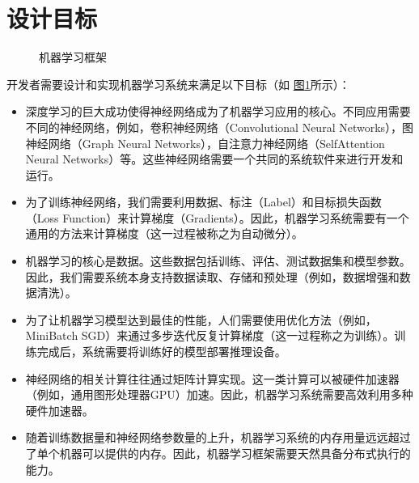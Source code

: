 \documentclass[letterpaper,10pt,english]{sphinxmanual}
\let\sphinxpxdimen\pdfpxdimen\else\newdimen\sphinxpxdimen
\begin{document}
\section{设计目标}
\label{\detokenize{chapter_introduction/requirements_for_machine_learning_systems:id1}}\label{\detokenize{chapter_introduction/requirements_for_machine_learning_systems::doc}}
\begin{figure}[H]
\centering
\capstart

\noindent\sphinxincludegraphics[width=600\sphinxpxdimen]{{framework_position}.png}
\caption{机器学习框架}\label{\detokenize{chapter_introduction/requirements_for_machine_learning_systems:id2}}\label{\detokenize{chapter_introduction/requirements_for_machine_learning_systems:framework-position}}\end{figure}

\sphinxAtStartPar
开发者需要设计和实现机器学习系统来满足以下目标（如
\hyperref[\detokenize{chapter_introduction/requirements_for_machine_learning_systems:framework-position}]{图\ref{\detokenize{chapter_introduction/requirements_for_machine_learning_systems:framework-position}}}所示）：
\begin{itemize}
\item {} 
\sphinxAtStartPar
{}
深度学习的巨大成功使得神经网络成为了机器学习应用的核心。不同应用需要不同的神经网络，例如，卷积神经网络（Convolutional
Neural Networks），图神经网络（Graph Neural
Networks），自注意力神经网络（Self\sphinxhyphen{}Attention Neural
Networks）等。这些神经网络需要一个共同的系统软件来进行开发和运行。

\item {} 
\sphinxAtStartPar
{}
为了训练神经网络，我们需要利用数据、标注（Label）和目标损失函数（Loss
Function）来计算梯度（Gradients）。因此，机器学习系统需要有一个通用的方法来计算梯度（这一过程被称之为自动微分）。

\item {} 
\sphinxAtStartPar
{}
机器学习的核心是数据。这些数据包括训练、评估、测试数据集和模型参数。因此，我们需要系统本身支持数据读取、存储和预处理（例如，数据增强和数据清洗）。

\item {} 
\sphinxAtStartPar
{}
为了让机器学习模型达到最佳的性能，人们需要使用优化方法（例如，Mini\sphinxhyphen{}Batch
SGD）来通过多步迭代反复计算梯度（这一过程称之为训练）。训练完成后，系统需要将训练好的模型部署推理设备。

\item {} 
\sphinxAtStartPar
{}
神经网络的相关计算往往通过矩阵计算实现。这一类计算可以被硬件加速器（例如，通用图形处理器\sphinxhyphen{}GPU）加速。因此，机器学习系统需要高效利用多种硬件加速器。

\item {} 
\sphinxAtStartPar
{}
随着训练数据量和神经网络参数量的上升，机器学习系统的内存用量远远超过了单个机器可以提供的内存。因此，机器学习框架需要天然具备分布式执行的能力。

\end{itemize}
\end{document}
